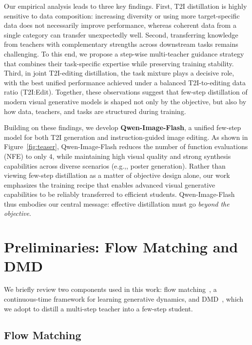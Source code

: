 \documentclass{llmxive}
\providecommand{\eg}{e.g.,\xspace}
\begin{document}
Our empirical analysis leads to three key findings. First, T2I distillation is highly sensitive to data composition: increasing diversity or using more target-specific data does not necessarily improve performance, whereas coherent data from a single category can transfer unexpectedly well. Second, transferring knowledge from teachers with complementary strengths across downstream tasks remains challenging. To this end, we propose a step-wise multi-teacher guidance strategy that combines their task-specific expertise while preserving training stability. Third, in joint T2I-editing distillation, the task mixture plays a decisive role, with the best unified performance achieved under a balanced T2I-to-editing data ratio (T2I:Edit). Together, these observations suggest that few-step distillation of modern visual generative models is shaped not only by the objective, but also by how data, teachers, and tasks are structured during training.


Building on these findings, we develop \textbf{Qwen-Image-Flash}, a unified few-step model for both T2I generation and instruction-guided image editing. As shown in Figure~\ref{fig:teaser}, Qwen-Image-Flash reduces the number of function evaluations (NFE) to only $4$, while maintaining high visual quality and strong synthesis capabilities across diverse scenarios (\eg, poster generation). Rather than viewing few-step distillation as a matter of objective design alone, our work emphasizes the training recipe that enables advanced visual generative capabilities to be reliably transferred to efficient students. Qwen-Image-Flash thus embodies our central message: effective distillation must go \textit{beyond the objective}.






\section{Preliminaries: Flow Matching and DMD}

We briefly review two components used in this work: flow matching~\citep{lipman2022flow}, a continuous-time framework for learning generative dynamics, and DMD~\citep{yin2024improved}, which we adopt to distill a multi-step teacher into a few-step student.

\subsection{Flow Matching}
\end{document}
